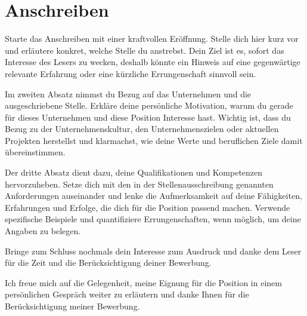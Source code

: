 \section{Anschreiben}\label{sec:anschreiben}
\makelettertitle

Starte das Anschreiben mit einer kraftvollen Eröffnung.
Stelle dich hier kurz vor und erläutere konkret, welche Stelle du anstrebst.
Dein Ziel ist es, sofort das Interesse des Lesers zu wecken, deshalb könnte ein Hinweis auf eine gegenwärtige relevante Erfahrung oder eine kürzliche Errungenschaft sinnvoll sein.

Im zweiten Absatz nimmst du Bezug auf das Unternehmen und die ausgeschriebene Stelle.
Erkläre deine persönliche Motivation, warum du gerade für dieses Unternehmen und diese Position Interesse hast.
Wichtig ist, dass du Bezug zu der Unternehmenskultur, den Unternehmenszielen oder aktuellen Projekten herstellst und klarmachst, wie deine Werte und beruflichen Ziele damit übereinstimmen.

Der dritte Absatz dient dazu, deine Qualifikationen und Kompetenzen hervorzuheben.
Setze dich mit den in der Stellenausschreibung genannten Anforderungen auseinander und lenke die Aufmerksamkeit auf deine Fähigkeiten, Erfahrungen und Erfolge, die dich für die Position passend machen.
Verwende spezifische Beispiele und quantifiziere Errungenschaften, wenn möglich, um deine Angaben zu belegen.

Bringe zum Schluss nochmals dein Interesse zum Ausdruck und danke dem Leser für die Zeit und die Berücksichtigung deiner Bewerbung.

Ich freue mich auf die Gelegenheit, meine Eignung für die Position in einem persönlichen Gespräch weiter zu erläutern und danke Ihnen für die Berücksichtigung meiner Bewerbung.

\makeletterclosing
